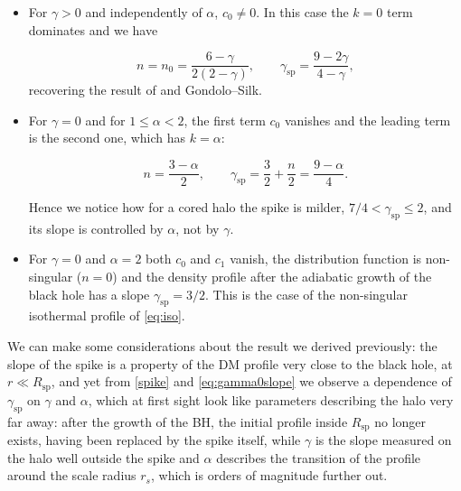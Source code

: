 \begin{itemize}

\item For $\gamma > 0$ and independently of $\alpha$,  $c_0 \neq 0$. 
In this case the $k=0$ term dominates and we have

\begin{equation}
n = n_0 = \frac{6-\gamma}{2(2-\gamma)},
\qquad
\gamma_{\mathrm{sp}} = \frac{9-2\gamma}{4-\gamma} ,
\end{equation}
recovering the result of \cite{Quinlan_1995} and Gondolo--Silk. 


\item For $\gamma = 0$ and for $1 \le \alpha < 2$, the first term $c_0$ vanishes
and the leading
term is the second one, which has $k=\alpha$:

\begin{equation} \label{eq:gamma0slope}
n = \frac{3-\alpha}{2},
\qquad
\gamma_{\mathrm{sp}} = \frac{3}{2} + \frac{n}{2} = \frac{9-\alpha}{4}.
\end{equation}

Hence we notice how for a cored halo the spike is milder, $7/4 < \gamma_{\mathrm{sp}} \le 2$, and its slope is controlled by $\alpha$,
not by $\gamma$. 

\item For $\gamma = 0$ and $\alpha = 2$ both $c_0$ and $c_1$ vanish,
the distribution function is non-singular ($n=0$) and 
the density profile after the adiabatic growth of the
black hole has a slope $\gamma_{\mathrm{sp}} = 3/2$. This is the case of the non-singular
isothermal profile of \cref{eq:iso}.

\end{itemize}


We can make some considerations about the result we derived previously:
the slope of the spike is a property of the DM profile very close to the black hole,
at $r \ll R_{\mathrm{sp}}$, and yet from \cref{spike} and
\cref{eq:gamma0slope} we observe a dependence of $\gamma_{\mathrm{sp}}$ on $\gamma$ and $\alpha$, which
at first sight look like parameters describing the halo very far away: after the growth
of the BH, the initial profile inside $R_{\mathrm{sp}}$ no longer exists, having been
replaced by the spike itself, while $\gamma$ is the slope measured on the halo well
outside the spike and $\alpha$ describes the transition of the
profile around the scale radius $r_s$, which is orders of magnitude further out.

